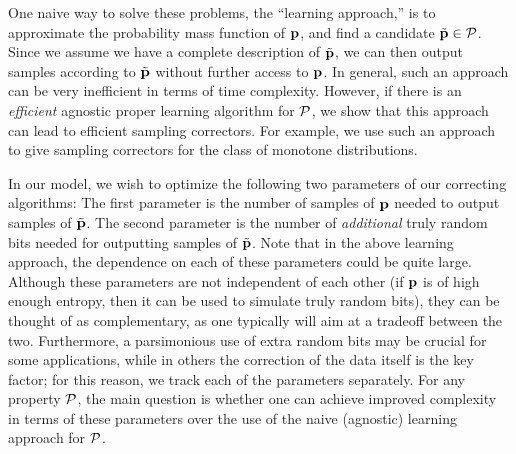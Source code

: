 One naive way to solve these problems, the ``learning approach,''
is to approximate the probability mass function of $\mathbf{p}$, 
and find a candidate $\tilde{\mathbf{p}} \in \mathcal{P}$.
Since we assume we have a complete description
of $\tilde{\mathbf{p}}$, we can then output samples according to $\tilde{\mathbf{p}}$ 
without further access to $\mathbf{p}$.  
In general, such an approach can be very inefficient in terms of time complexity.
However, if there is 
an  \emph{efficient} agnostic proper learning algorithm\footnotemark{} for $\mathcal{P}$, 
we show that this approach can lead to efficient sampling correctors.
For example, we use such an approach to give sampling correctors
for the class of monotone distributions.
\smallskip
{}

In our model, we wish to optimize the following 
two parameters of our correcting algorithms:
The first parameter 
is the number of samples of $\mathbf{p}$ needed to output samples of $\tilde{\mathbf{p}}$. The
second parameter is
the number of  \emph{additional} truly random bits 
needed for outputting samples of $\tilde{\mathbf{p}}$.
Note that in the above learning approach, the dependence on each
of these parameters could be quite large.
Although these parameters are not independent of each
other (if $\mathbf{p}$ is of high enough entropy, then it can be used
to simulate truly random bits), they can be thought of as complementary, as one typically will aim at a tradeoff between the two. 
Furthermore, a parsimonious use of extra random bits may be crucial 
for some applications,
while in others the correction of the data itself is the key factor; 
for this reason, 
we track each of the parameters separately.
For any property $\mathcal{P}$, the main question is whether one
can achieve improved complexity  in terms of
these parameters over the use of the naive (agnostic) learning approach
for $\mathcal{P}$.

